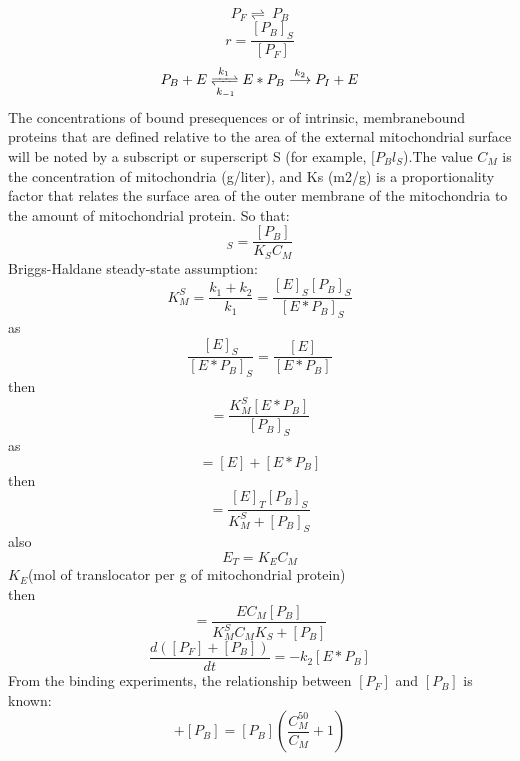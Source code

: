 \documentclass[UTF8]{ctexart}
\begin{document}
\begin{displaymath}
P_F\rightleftharpoons\ P_B
\end{displaymath}
\begin{displaymath}
r=\frac{[P_B]_S}{[P_F]}
\end{displaymath}
\begin{displaymath}
P_B+E \xrightleftharpoons[k_{-1}]{k_1}  E * P_B \stackrel{k_2}{\longrightarrow} P_I+E
\end{displaymath}
The concentrations of bound presequences or of intrinsic, membranebound proteins that are defined relative to the area of the external mitochondrial surface will be noted by a subscript or superscript S (for example, $[P_Bl_S$).The value $C_M$ is the concentration of mitochondria (g/liter), and Ks (m2/g) is a proportionality factor that relates the surface area of the outer membrane of the mitochondria to the amount of mitochondrial protein. So that:
\begin{equation}
[P_B]_S=\frac{[P_B]}{K_S C_M}
\end{equation}
Briggs-Haldane steady-state assumption:
\begin{equation}
K_M^S=\frac{k_1+k_2}{k_1}=\frac{[E]_S [P_B]_S}{[E*P_B]_S}
\end{equation}
as
\begin{equation}
\frac{[E]_S}{[E*P_B]_S}=\frac{[E]}{[E*P_B]}
\end{equation}
then
\begin{equation}
[E]=\frac{K_M^S[E*P_B]}{[P_B]_S}
\end{equation}
as
\begin{equation}
[E_T]=[E]+[E*P_B]
\end{equation}
then
\begin{equation}
[E*P_B]=\frac{[E]_T[P_B]_S}{K_M^S+[P_B]_S}
\end{equation}
also
\begin{equation}
E_T=K_EC_M
\end{equation}
$K_E$(mol of translocator per g of mitochondrial protein) \\
then
\begin{equation}
[E*P_B]=\frac{EC_M[P_B]}{K_M^SC_MK_S+[P_B]}
\end{equation}
\begin{equation}
\frac{d([P_F]+[P_B])}{d t}=-k_2[E*P_B]
\end{equation}
From the binding experiments, the relationship between $[P_F]$ and $[P_B]$ is known:
\begin{equation}
[P_F]+[P_B]=[P_B](\frac{C_M^{50}}{C_M}+1)
\end{equation}
\end{document}
